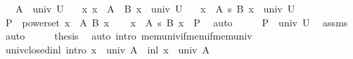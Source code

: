 \begin{isabellebody}
\ \ \ {\isachardoublequoteopen}A\ {\isasymin}\ univ\ U{\isachardoublequoteclose}\isanewline
\ \ \ {\isachardoublequoteopen}{\isasymAnd}x{\isachardot}{\kern0pt}\ x\ {\isasymin}\ A\ {\isasymLongrightarrow}\ B\ x\ {\isasymin}\ univ\ U{\isachardoublequoteclose}\isanewline
\ \ \ {\isachardoublequoteopen}{\isacharparenleft}{\kern0pt}{\isacharparenleft}{\kern0pt}x\ {\isasymin}\ A{\isacharparenright}{\kern0pt}\ {\isasymrightarrow}s\ {\isacharparenleft}{\kern0pt}B\ x{\isacharparenright}{\kern0pt}{\isacharparenright}{\kern0pt}\ {\isasymin}\ univ\ U{\isachardoublequoteclose}\isanewline
%
\isadelimproof
%
\endisadelimproof
%
\isatagproof
{}\isamarkupfalse%
\ {\isacharminus}{\kern0pt}\isanewline
\ \ \isamarkupfalse%
\ {\isacharquery}{\kern0pt}P\ {\isacharequal}{\kern0pt}\ {\isachardoublequoteopen}powerset\ {\isacharparenleft}{\kern0pt}{\isasymSum}x\ {\isasymin}\ A{\isachardot}{\kern0pt}\ B\ x{\isacharparenright}{\kern0pt}{\isachardoublequoteclose}\isanewline
\ \ \isamarkupfalse%
\ {\isachardoublequoteopen}{\isacharparenleft}{\kern0pt}{\isacharparenleft}{\kern0pt}x\ {\isasymin}\ A{\isacharparenright}{\kern0pt}\ {\isasymrightarrow}s\ {\isacharparenleft}{\kern0pt}B\ x{\isacharparenright}{\kern0pt}{\isacharparenright}{\kern0pt}\ {\isasymsubseteq}\ {\isacharquery}{\kern0pt}P{\isachardoublequoteclose}\ \isamarkupfalse%
\ auto\isanewline
\ \ \isamarkupfalse%
\ \isamarkupfalse%
\ {\isachardoublequoteopen}{\isacharquery}{\kern0pt}P\ {\isasymin}\ univ\ U{\isachardoublequoteclose}\ \isamarkupfalse%
\ assms\ \isamarkupfalse%
\ auto\isanewline
\ \ \isamarkupfalse%
\ \isamarkupfalse%
\ {\isacharquery}{\kern0pt}thesis\ \isamarkupfalse%
\ {\isacharparenleft}{\kern0pt}auto\ intro{\isacharcolon}{\kern0pt}\ mem{\isacharunderscore}{\kern0pt}univ{\isacharunderscore}{\kern0pt}if{\isacharunderscore}{\kern0pt}mem{\isacharunderscore}{\kern0pt}if{\isacharunderscore}{\kern0pt}mem{\isacharunderscore}{\kern0pt}univ{\isacharparenright}{\kern0pt}\isanewline
{}\isamarkupfalse%
%
\endisatagproof
{\isafoldproof}%
%
\isadelimproof
\isanewline
%
\endisadelimproof
\isanewline
{}\isamarkupfalse%
\ univ{\isacharunderscore}{\kern0pt}closed{\isacharunderscore}{\kern0pt}inl\ {\isacharbrackleft}{\kern0pt}intro{\isacharbang}{\kern0pt}{\isacharbrackright}{\kern0pt}{\isacharcolon}{\kern0pt}\ {\isachardoublequoteopen}x\ {\isasymin}\ univ\ A\ {\isasymLongrightarrow}\ inl\ x\ {\isasymin}\ univ\ A{\isachardoublequoteclose}\isanewline

\end{isabellebody}
